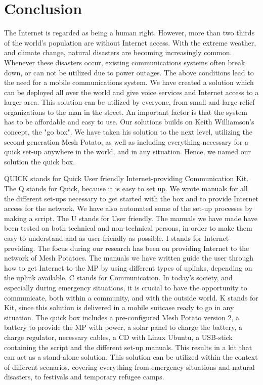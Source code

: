 \chapter{Conclusion}
\label{chp:conclusion} 

The Internet is regarded as being a human right. However, more than two thirds of the world's population are without Internet access. With the extreme weather, and climate change, natural disasters are becoming increasingly common. Whenever these disasters occur, existing communications systems often break down, or can not be utilized due to power outages. The above conditions lead to the need for a mobile communications system. We have created a solution which can be deployed all over the world and give voice services and Internet access to a larger area. This solution can be utilized by everyone, from small and large relief organizations to the man in the street. An important factor is that the system has to be affordable and easy to use. Our solutions builds on Keith Williamson's concept, the "go box". We have taken his solution to the next level, utilizing the second generation Mesh Potato, as well as including everything necessary for a quick set-up anywhere in the world, and in any situation. Hence, we named our solution the \gls{quick} box. 

QUICK stands for Quick User friendly Internet-providing Communication Kit. The Q stands for Quick, because it is easy to set up. We wrote manuals for all the different set-ups necessary to get started with the box and to provide Internet access for the network. We have also automated some of the set-up processes by making a script. The U stands for User friendly. The manuals we have made have been tested on both technical and non-technical persons, in order to make them easy to understand and as user-friendly as possible. I stands for Internet-providing. The focus during our research has been on providing Internet to the network of Mesh Potatoes. The manuals we have written guide the user through how to get Internet to the MP by using different types of uplinks, depending on the uplink available. C stands for Communication. In today's society, and especially during emergency situations, it is crucial to have the opportunity to communicate, both within a community, and with the outside world. K stands for Kit, since this solution is delivered in a mobile suitcase ready to go in any situation. The \gls{quick} box includes a pre-configured Mesh Potato version 2, a battery to provide the MP with power, a solar panel to charge the battery, a charge regulator, necessary cables, a CD with Linux Ubuntu, a USB-stick containing the script and the different set-up manuals. 
This results in a kit that can act as a stand-alone solution. This solution can be utilized within the context of different scenarios, covering everything from emergency situations and natural disasters, to festivals and temporary refugee camps.

